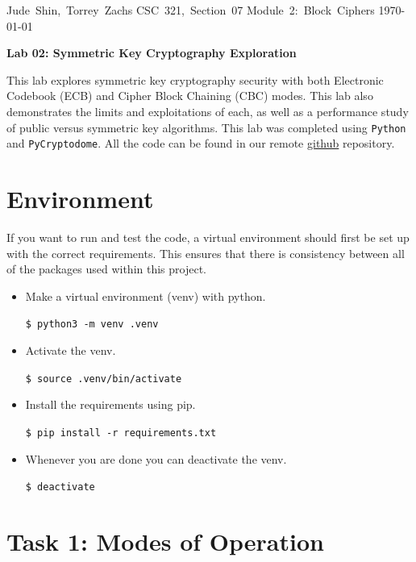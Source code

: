 \documentclass[11pt]{article}
\begin{document}
\hfill\vbox{\hbox{Jude Shin, Torrey Zachs}
		\hbox{CSC 321, Section 07}	
		\hbox{Module 2: Block Ciphers}	
		\hbox{\today}}\par

\bigskip
\centerline{\Large\bf Lab 02: Symmetric Key Cryptography Exploration}\par
\bigskip

This lab explores symmetric key cryptography security with both Electronic Codebook (ECB) and Cipher Block Chaining (CBC) modes. This lab also demonstrates the limits and exploitations of each, as well as a performance study of public versus symmetric key algorithms. This lab was completed using {\tt Python} and {\tt PyCryptodome}. All the code can be found in our remote \href{https://github.com/jude-shin/CSC\_321}{github} repository.

\section*{Environment}

If you want to run and test the code, a virtual environment should first be set up with the correct requirements. This ensures that there is consistency between all of the packages used within this project.

\begin{itemize}
	\item Make a virtual environment (venv) with python.

		\verb|$ python3 -m venv .venv|

	\item Activate the venv.

		\verb|$ source .venv/bin/activate|

	\item Install the requirements using pip.

		\verb|$ pip install -r requirements.txt|

	\item Whenever you are done you can deactivate the venv.

		\verb|$ deactivate|

\end{itemize}

\section*{Task 1: Modes of Operation}
\end{document}
